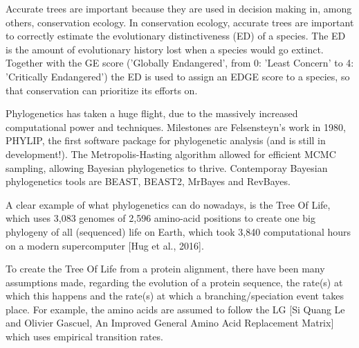 
Accurate trees are important because they are used in 
decision making in, among others, conservation ecology.
In conservation ecology, accurate trees are important
to correctly estimate the evolutionary distinctiveness (ED) of a species.
The ED is the amount of evolutionary history lost when a species would go extinct.
Together with the GE score ('Globally Endangered', from 0: 'Least Concern' 
to 4: 'Critically Endangered') the ED is used to assign an EDGE score 
to a species, so that conservation can prioritize its efforts on.


Phylogenetics has taken a huge flight, due to the massively increased
computational power and techniques. Milestones are Felsensteyn's work
in 1980, PHYLIP, the first software package for phylogenetic 
analysis (and is still in development!).
The Metropolis-Hasting algorithm allowed for efficient MCMC
sampling, allowing Bayesian phylogenetics to thrive. Contemporay
Bayesian phylogenetics tools are BEAST, BEAST2, MrBayes and RevBayes.

%
%

A clear example of what phylogenetics can do nowadays,
is the Tree Of Life, which uses 
3,083 genomes of 2,596 amino-acid positions 
to create one big phylogeny of all (sequenced) life on Earth,
which took 3,840 computational hours on a modern supercomputer [Hug et al., 2016].

%
%
%

To create the Tree Of Life from a protein alignment, 
there have been many assumptions 
made, regarding the evolution of a protein sequence, 
the rate(s) at which this happens and the rate(s) at which 
a branching/speciation event takes place. For example,
the amino acids are assumed to follow the LG [Si Quang 
Le and Olivier Gascuel, An Improved General Amino Acid Replacement Matrix] 
which uses empirical transition rates.

